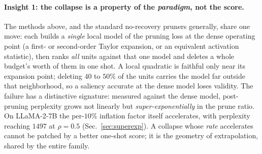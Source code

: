 \paragraph{Insight 1: the collapse is a property of the \emph{paradigm}, not the score.}
The methods above, and the standard no-recovery pruners generally, share one move: each builds a
\emph{single} local model of the pruning loss at the dense operating point (a first- or second-order
Taylor expansion, or an equivalent activation statistic), then ranks \emph{all} units against that one
model and deletes a whole budget's worth of them in one shot. A local quadratic is faithful only near its
expansion point; deleting $40$ to $50\%$ of the units carries the model far outside that neighborhood, so a
saliency accurate at the dense model loses validity. The failure has a distinctive signature: measured
against the dense model, post-pruning perplexity grows not linearly but \emph{super-exponentially} in the
prune ratio. On LLaMA-2-7B the per-$10\%$ inflation factor itself accelerates, with perplexity reaching
$1497$ at $\rho{=}0.5$ (Sec.~\ref{sec:superexp}). A collapse whose \emph{rate} accelerates cannot be patched by a
better one-shot score; it is the geometry of extrapolation, shared by the entire family.


